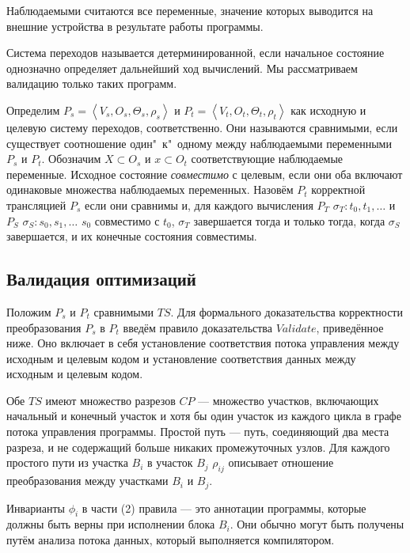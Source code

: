 Наблюдаемыми считаются все переменные, значение которых выводится на внешние устройства в результате работы программы.

Система переходов называется детерминированной, если начальное состояние однозначно определяет дальнейший ход вычислений. Мы рассматриваем валидацию только таких программ.

Определим $P_{s} = \left\langle  V_{s}, O_{s}, \Theta_{s}, \rho_{s} \right\rangle $ и $P_{t} = \left\langle  V_{t}, O_{t}, \Theta_{t}, \rho_{t} \right\rangle $ как исходную и целевую систему переходов, соответственно. Они называются сравнимыми, если существует соотношение один"~к"~одному между наблюдаемыми переменными $P_{s}$ и $P_{t}$. Обозначим $ X \subset O_{s} $ и $ x \subset O_{t} $ соответствующие наблюдаемые переменные. Исходное состояние \emph{совместимо} с целевым, если они оба включают одинаковые множества наблюдаемых переменных. Назовём $P_{t}$ корректной трансляцией $P_{s}$ если они сравнимы и, для каждого вычисления $P_{T}$ $\sigma_{T}: t_{0}, t_{1}, \ldots$ и $P_{S}$ $\sigma_{S}: s_{0}, s_{1}, \ldots $ $s_{0}$ совместимо с $t_{0}$, $\sigma_{T}$ завершается тогда и только тогда, когда $\sigma_{S}$ завершается, и их конечные состояния совместимы.

\subsection{Валидация оптимизаций}

Положим $P_{s}$ и $P_{t}$ сравнимыми $TS$. Для формального доказательства корректности преобразования $P_{s}$ в $P_{t}$ введём правило доказательства $Validate$, приведённое ниже. Оно включает в себя установление соответствия потока управления между исходным и целевым кодом и установление соответствия данных между исходным и целевым кодом.

Обе $TS$ имеют множество разрезов $CP$ --- множество участков, включающих начальный и конечный участок и хотя бы один участок из каждого цикла в графе потока управления программы. Простой путь --- путь, соединяющий два места разреза, и не содержащий больше никаких промежуточных узлов. Для каждого простого пути из участка $B_{i}$ в участок $B_{j}$ $\rho_{ij}$ описывает отношение преобразования между участками $B_{i}$ и $B_{j}$.

Инварианты $\phi_{i}$ в части (2) правила --- это аннотации программы, которые должны быть верны при исполнении блока $B_{i}$. Они обычно могут быть получены путём анализа потока данных, который выполняется компилятором.

